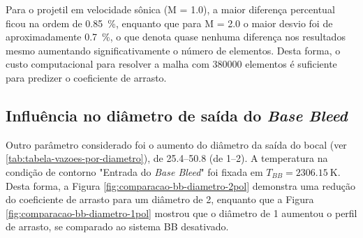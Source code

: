 Para o projetil em velocidade sônica (M = \num{1,0}), a maior diferença percentual ficou na ordem de \qty{0,85}{\percent}, enquanto que para M = \num{2,0} o maior desvio foi de aproximadamente \qty{0,7}{\percent}, o que denota quase nenhuma diferença nos resultados mesmo aumentando significativamente o número de elementos. Desta forma, o custo computacional para resolver a malha com \num{380000} elementos é suficiente para predizer o coeficiente de arrasto.

\subsection{Influência no diâmetro de saída do \textit{Base Bleed}} \label{subsec:resultados-com-basebleed-diametros}

Outro parâmetro considerado foi o aumento do diâmetro da saída do bocal (ver \autoref{tab:tabela-vazoes-por-diametro}), de \qtyrange{25,4}{50,8}{\millimetre} (de \qtyrange{1}{2}{\polegada}). A temperatura na condição de contorno "Entrada do \textit{Base Bleed}"{} foi fixada em $T_{BB} = \qty{2306,15}{\kelvin}$. Desta forma, a Figura \ref{fig:comparacao-bb-diametro-2pol} demonstra uma redução do coeficiente de arrasto para um diâmetro de \qty{2}{\polegada}, enquanto que a Figura \ref{fig:comparacao-bb-diametro-1pol} mostrou que o diâmetro de \qty{1}{\polegada} aumentou o perfil de arrasto, se comparado ao sistema BB desativado.

